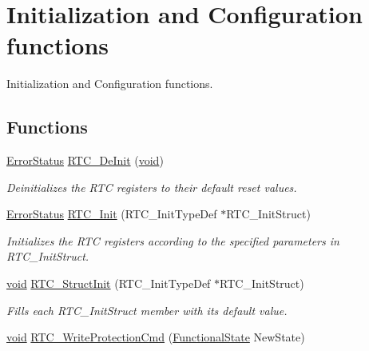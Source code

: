 \hypertarget{group___r_t_c___group1}{\section{Initialization and Configuration functions}
\label{group___r_t_c___group1}
}


Initialization and Configuration functions.  


\subsection*{Functions}
\begin{DoxyCompactItemize}
\item 
\hyperlink{group___exported__types_ga8333b96c67f83cba354b3407fcbb6ee8}{Error\-Status} \hyperlink{group___r_t_c___group1_ga9777c6cc4a99c339ebc527a791b2ebe7}{R\-T\-C\-\_\-\-De\-Init} (\hyperlink{group___n_a_m_e_ga18028b8badbf1ea7e704ccac3c488e82}{void})
\begin{DoxyCompactList}\small\item\em Deinitializes the R\-T\-C registers to their default reset values. \end{DoxyCompactList}\item 
\hyperlink{group___exported__types_ga8333b96c67f83cba354b3407fcbb6ee8}{Error\-Status} \hyperlink{group___r_t_c___group1_ga8eb747bf9698b2482ba6ef4d811de8e0}{R\-T\-C\-\_\-\-Init} (R\-T\-C\-\_\-\-Init\-Type\-Def $\ast$R\-T\-C\-\_\-\-Init\-Struct)
\begin{DoxyCompactList}\small\item\em Initializes the R\-T\-C registers according to the specified parameters in R\-T\-C\-\_\-\-Init\-Struct. \end{DoxyCompactList}\item 
\hyperlink{group___n_a_m_e_ga18028b8badbf1ea7e704ccac3c488e82}{void} \hyperlink{group___r_t_c___group1_gab466f3348de3236976e9aec7d6025dff}{R\-T\-C\-\_\-\-Struct\-Init} (R\-T\-C\-\_\-\-Init\-Type\-Def $\ast$R\-T\-C\-\_\-\-Init\-Struct)
\begin{DoxyCompactList}\small\item\em Fills each R\-T\-C\-\_\-\-Init\-Struct member with its default value. \end{DoxyCompactList}\item 
\hyperlink{group___n_a_m_e_ga18028b8badbf1ea7e704ccac3c488e82}{void} \hyperlink{group___r_t_c___group1_ga9d4bdfd3ae6957630d15d2497573b7c7}{R\-T\-C\-\_\-\-Write\-Protection\-Cmd} (\hyperlink{group___exported__types_gac9a7e9a35d2513ec15c3b537aaa4fba1}{Functional\-State} New\-State)

\end{DoxyCompactItemize}
